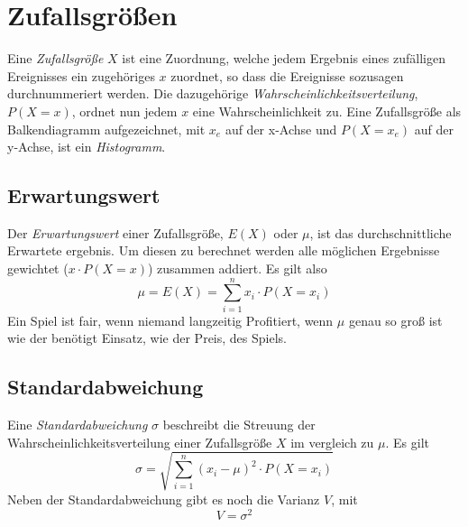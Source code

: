 \documentclass{article}
\begin{document}
\section{Zufallsgrößen} 
Eine \emph{Zufallsgröße} $X$ ist eine Zuordnung, welche jedem Ergebnis eines zufälligen Ereignisses ein zugehöriges $x$ zuordnet, so dass die Ereignisse sozusagen durchnummeriert werden. Die dazugehörige \emph{Wahrscheinlichkeitsverteilung}, $P(X=x)$, ordnet nun jedem $x$ eine Wahrscheinlichkeit zu. \newline
Eine Zufallsgröße als Balkendiagramm aufgezeichnet, mit $x_e$ auf der x-Achse und $P(X=x_e)$ auf der y-Achse, ist ein \emph{Histogramm}.
 
\subsection{Erwartungswert}
Der \emph{Erwartungswert} einer Zufallsgröße, $E(X)$ oder $\mu$, ist das durchschnittliche Erwartete ergebnis. Um diesen zu berechnet werden alle möglichen Ergebnisse gewichtet ($x \cdot P(X=x)$) zusammen addiert. Es gilt also
\[
 \mu = E(X) = \sum_{i=1}^n x_i \cdot P(X=x_i) 
\]  
Ein Spiel ist fair, wenn niemand langzeitig Profitiert, wenn $\mu$ genau so groß ist wie der benötigt Einsatz, wie der Preis, des Spiels.
 
\subsection{Standardabweichung}
Eine \emph{Standardabweichung} $\sigma$ beschreibt die Streuung der Wahrscheinlichkeitsverteilung einer Zufallsgröße $X$ im vergleich zu $\mu$. Es gilt
\[
 \sigma = \sqrt{\sum_{i=1}^n (x_i - \mu)^2 \cdot P(X=x_i)}
\]
Neben der Standardabweichung gibt es noch die Varianz $V$, mit
\[ 
 V = \sigma^2 
\]
 
\end{document}
